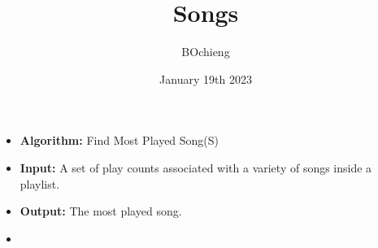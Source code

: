 \documentclass{article}
\title{Songs}
\author{BOchieng}
\date{January 19th 2023}
\begin{document}
\begin{itemize}
\item[]
\textbf{Algorithm:} Find Most Played Song(S)
\item[]
\textbf{Input:} A set of play counts associated with a variety of songs inside a playlist.
\item[]
\textbf{Output:} The most played song.
\item[]
\end{itemize}
\end{document}

